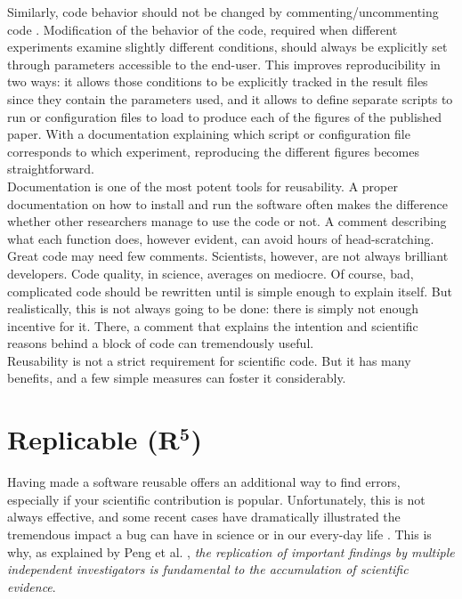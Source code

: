 \documentclass[a4paper,11pt]{article}
\begin{document}
Similarly, code behavior should not be changed by commenting/uncommenting code \citep{Wilson:2017}. Modification of the behavior of the code, required when different experiments examine slightly different conditions, should always be explicitly set through parameters accessible to the end-user. This improves reproducibility in two ways: it allows those conditions to be explicitly tracked in the result files since they contain the parameters used, and it allows to define separate scripts to run or configuration files to load to produce each of the figures of the published paper. With a documentation explaining which script or configuration file corresponds to which experiment, reproducing the different figures becomes straightforward.\\

Documentation is one of the most potent tools for reusability. A proper documentation on how to install and run the software often makes the difference whether other researchers manage to use the code or not. A comment describing what each function does, however evident, can avoid hours of head-scratching. Great code may need few comments. Scientists, however, are not always brilliant developers. Code quality, in science, averages on mediocre. Of course, bad, complicated code should be rewritten until is simple enough to explain itself. But realistically, this is not always going to be done: there is simply not enough incentive for it. There, a comment that explains the intention and scientific reasons behind a block of code can tremendously useful.\\

Reusability is not a strict requirement for scientific code. But it has many benefits, and a few simple measures can foster it considerably.


\section*{Replicable (R$^{\mathbf 5}$)}

Having made a software reusable offers an additional way to find errors, especially if your scientific contribution is popular. Unfortunately, this is not always effective, and some recent cases have dramatically illustrated the tremendous impact a bug can have in science
\citep{Eklund:2016} or in our every-day life \citep{Durumeric:2014}. This is
why, as explained by Peng et al. \cite{Peng:2006}, {\em the replication of
  important findings by multiple independent investigators is fundamental to
  the accumulation of scientific evidence}.\\
\end{document}
